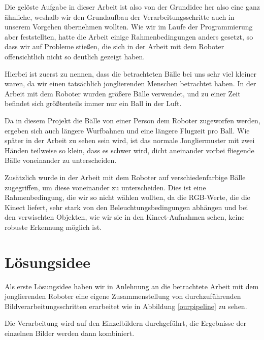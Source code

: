 \documentclass[12pt,a4paper,ngerman]{scrartcl}
\begin{document}
Die gelöste Aufgabe in dieser Arbeit ist also von der Grundidee her also eine ganz
ähnliche, weshalb wir den Grundaufbau der Verarbeitungsschritte auch in unserem 
Vorgehen übernehmen wollten. Wie wir im Laufe der Programmierung aber feststellten,
hatte die Arbeit einige Rahmenbedingungen anders gesetzt, so dass wir auf Probleme 
stießen, die sich in der Arbeit mit dem Roboter offensichtlich nicht so deutlich
gezeigt haben.

Hierbei ist zuerst zu nennen, dass die betrachteten Bälle bei uns sehr viel kleiner
waren, da wir einen tatsächlich jonglierenden Menschen betrachtet haben. In der
Arbeit mit dem Roboter wurden größere Bälle verwendet, und zu einer Zeit befindet
sich größtenteils immer nur ein Ball in der Luft.

Da in diesem Projekt die Bälle von einer Person dem Roboter zugeworfen werden,
ergeben sich auch längere Wurfbahnen und eine längere Flugzeit pro Ball. Wie
später in der Arbeit zu sehen sein wird, ist das normale Jongliermuster mit zwei
Händen teilweise so klein, dass es schwer wird, dicht aneinander vorbei fliegende
Bälle voneinander zu unterscheiden.

Zusätzlich wurde in der Arbeit mit dem Roboter auf verschiedenfarbige Bälle 
zugegriffen, um diese voneinander zu unterscheiden. Dies ist eine Rahmenbedingung,
die wir so nicht wählen wollten, da die RGB-Werte, die die Kinect liefert, sehr stark 
von den Beleuchtungsbedingungen abhängen und bei den verwischten Objekten, wie
wir sie in den Kinect-Aufnahmen sehen, keine robuste Erkennung möglich ist.


\section{Lösungsidee}

Als erste Lösungsidee haben wir in Anlehnung an die betrachtete Arbeit mit dem 
jonglierenden Roboter eine eigene Zusammenstellung von durchzuführenden Bildverarbeitungsschritten
erarbeitet wie in Abbildung \ref{ourpipeline} zu sehen.

Die Verarbeitung wird auf den Einzelbildern durchgeführt, die Ergebnisse der 
einzelnen Bilder werden dann kombiniert.  
\end{document}
